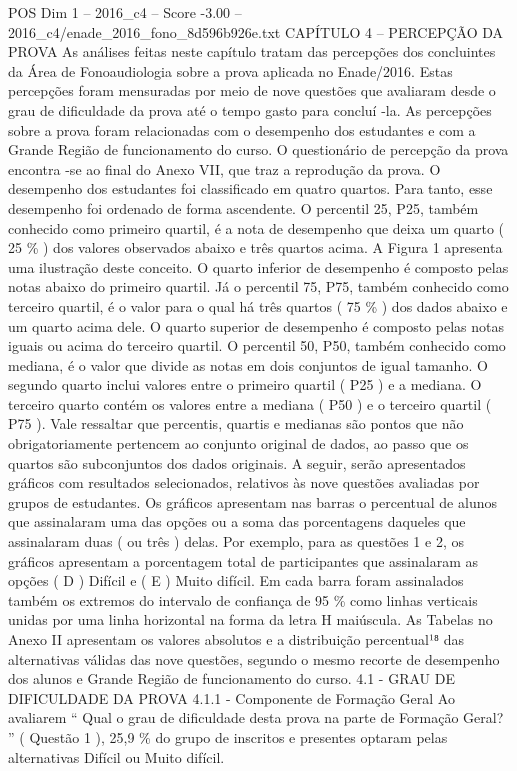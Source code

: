 \begin{textsample}{POS Dim 1 – 2016\_c4 – Score -3.00 – 2016\_c4/enade\_2016\_fono\_8d596b926e.txt}  \label{ex:f1_pos_287}
CAPÍTULO 4 – PERCEPÇÃO DA PROVA As análises feitas neste capítulo tratam das percepções dos concluintes da Área de Fonoaudiologia sobre a prova aplicada no Enade/2016.
Estas percepções foram mensuradas por meio de nove questões que avaliaram desde o grau de dificuldade da prova até o tempo gasto para concluí -la.
As percepções sobre a prova foram relacionadas com o desempenho dos estudantes e com a Grande Região de funcionamento do curso.
O questionário de percepção da prova encontra -se ao final do Anexo VII, que traz a reprodução da prova.
O desempenho dos estudantes foi classificado em quatro quartos.
Para tanto, esse desempenho foi ordenado de forma ascendente.
O percentil 25, P25, também conhecido como primeiro quartil, é a nota de desempenho que deixa um quarto ( 25 \% ) dos valores observados abaixo e três quartos acima.
A Figura 1 apresenta uma ilustração deste conceito.
O quarto inferior de desempenho é composto pelas notas abaixo do primeiro quartil.
Já o percentil 75, P75, também conhecido como terceiro quartil, é o valor para o qual há três quartos ( 75 \% ) dos dados abaixo e um quarto acima dele.
O quarto superior de desempenho é composto pelas notas iguais ou acima do terceiro quartil.
O percentil 50, P50, também conhecido como mediana, é o valor que divide as notas em dois conjuntos de igual tamanho.
O segundo quarto inclui valores entre o primeiro quartil ( P25 ) e a mediana.
O terceiro quarto contém os valores entre a mediana ( P50 ) e o terceiro quartil ( P75 ).
Vale ressaltar que percentis, quartis e medianas são pontos que não obrigatoriamente pertencem ao conjunto original de dados, ao passo que os quartos são subconjuntos dos dados originais.
A seguir, serão apresentados gráficos com resultados selecionados, relativos às nove questões avaliadas por grupos de estudantes.
Os gráficos apresentam nas barras o percentual de alunos que assinalaram uma das opções ou a soma das porcentagens daqueles que assinalaram duas ( ou três ) delas.
Por exemplo, para as questões 1 e 2, os gráficos apresentam a porcentagem total de participantes que assinalaram as opções ( D ) Difícil e ( E ) Muito difícil.
Em cada barra foram assinalados também os extremos do intervalo de confiança de 95 \% como linhas verticais unidas por uma linha horizontal na forma da letra H maiúscula.
As Tabelas no Anexo II apresentam os valores absolutos e a distribuição percentual¹⁸ das alternativas válidas das nove questões, segundo o mesmo recorte de desempenho dos alunos e Grande Região de funcionamento do curso. 4.1 - GRAU DE DIFICULDADE DA PROVA 4.1.1 - Componente de Formação Geral Ao avaliarem “ Qual o grau de dificuldade desta prova na parte de Formação Geral? ” ( Questão 1 ), 25,9 \% do grupo de inscritos e presentes optaram pelas alternativas Difícil ou Muito difícil.

\end{textsample}
